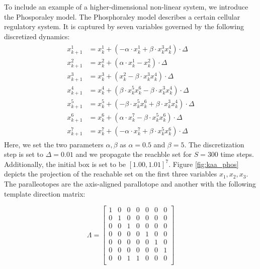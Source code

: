 \begin{example}
To include an example of a higher-dimensional non-linear system, we introduce the Phosporaley model. The Phosphoraley model describes a certain cellular regulatory system. It is captured by seven variables governed by the following discretized dynamics:
\begin{align}
  \begin{split}
      x^1_{k+1} &= x^1_k + ( -\alpha \cdot x^1_k + \beta \cdot x^3_k x^4_k)\cdot \Delta \\
      x^2_{k+1} &= x^2_k + (  \alpha\cdot  x^1_k - x^2_k)\cdot \Delta \\
      x^3_{k+1} &= x^3_k + ( x^2_k - \beta \cdot x^3_k x^4_k)\cdot \Delta \\
      x^4_{k+1} &= x^4_k + ( \beta \cdot x^5_k x^6_k - \beta \cdot x^3_k x^4_k)\cdot \Delta \\
      x^5_{k+1} &= x^5_k + ( -\beta \cdot x^5_k x^6_k + \beta \cdot x^3_k x^4_k)\cdot \Delta \\
      x^6_{k+1} &= x^6_k + ( \alpha\cdot  x^7_k - \beta \cdot x^5_k x^6_k)\cdot \Delta \\
      x^7_{k+1} &= x^7_k + ( -\alpha\cdot  x^7_k + \beta \cdot  x^5_k x^6_k)\cdot \Delta
  \end{split}
\end{align}
Here, we set the two parameters $\alpha,\beta$ as $\alpha=0.5$ and $\beta=5$. The discretization step is set to $\Delta =0.01$ and we propagate the reachble set for $S=300$ time steps. Additionally, the initial box is set to be $[1.00,1.01]^7$.
%
Figure \ref{fig:kaa_phos} depicts the projection of the reachable set on the first three variables $x_1, x_2, x_3$. The paralleotopes are the axis-aligned parallotope and another with the following template direction matrix:

\begin{equation}
  \Lambda = \begin{bmatrix}
            1 & 0 & 0 & 0 & 0 & 0 & 0 \\
            0 & 1 & 0 & 0 & 0 & 0 & 0 \\
            0 & 0 & 1 & 0 & 0 & 0 & 0 \\
            0 & 0 & 0 & 0 & 1 & 0 & 0 \\
            0 & 0 & 0 & 0 & 0 & 1 & 0 \\
            0 & 0 & 0 & 0 & 0 & 0 & 1 \\
            0 & 0 & 1 & 1 & 0 & 0 & 0 \\
            \end{bmatrix}
\end{equation}


\end{example}
